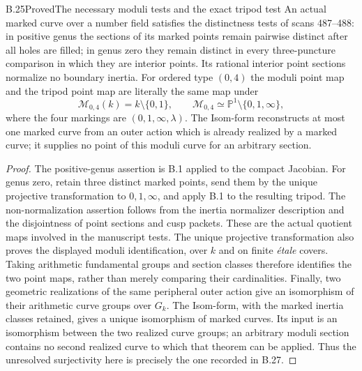 \begin{statement}{B.25}{Proved}{The necessary moduli tests and the exact tripod test}
An actual marked curve over a number field satisfies the distinctness
tests of scans 487--488: in positive genus the sections of its marked
points remain pairwise distinct after all holes are filled; in genus
zero they remain distinct in every three-puncture comparison in which
they are interior points.  Its rational interior point sections
normalize no boundary inertia.  For ordered type $(0,4)$ the moduli
point map and the tripod point map are literally the same map under
\[
 \mathcal M_{0,4}(k)=k\setminus\{0,1\},\qquad
 \mathcal M_{0,4}\simeq\mathbb P^1\setminus\{0,1,\infty\},
\]
where the four markings are $(0,1,\infty,\lambda)$.
The Isom-form reconstructs at most one marked curve from an outer
action which is already realized by a marked curve; it supplies no
point of this moduli curve for an arbitrary section.
\end{statement}
\begin{proof}
The positive-genus assertion is B.1 applied to the compact Jacobian.
For genus zero, retain three distinct marked points, send them by
the unique projective transformation to $0,1,\infty$, and apply B.1
to the resulting tripod.  The non-normalization assertion follows
from the inertia normalizer description and the disjointness of
point sections and cusp packets.  These are the actual quotient
maps involved in the manuscript tests.
The unique projective transformation also proves the displayed
moduli identification, over $k$ and on finite \emph{\'etale} covers.
Taking arithmetic fundamental groups and section classes therefore
identifies the two point maps, rather than merely comparing their
cardinalities.
Finally, two geometric realizations of the same peripheral outer
action give an isomorphism of their arithmetic curve groups over
$G_k$.  The Isom-form, with the marked inertia classes retained,
gives a unique isomorphism of marked curves.  Its input is an
isomorphism between the two realized curve groups; an arbitrary
moduli section contains no second realized curve to which that
theorem can be applied.  Thus the unresolved surjectivity here is
precisely the one recorded in B.27.
\end{proof}

